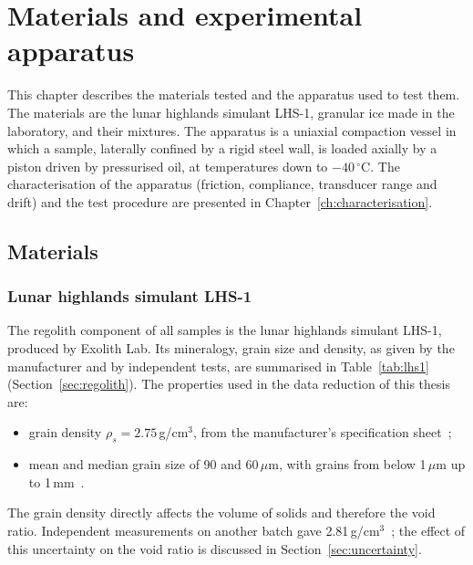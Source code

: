 \chapter{Materials and experimental apparatus}
\label{ch:materials_apparatus}%

This chapter describes the materials tested and the apparatus used to test them. The materials are the lunar highlands simulant LHS-1, granular ice made in the laboratory, and their mixtures. The apparatus is a uniaxial compaction vessel in which a sample, laterally confined by a rigid steel wall, is loaded axially by a piston driven by pressurised oil, at temperatures down to $-40\,^\circ$C. The characterisation of the apparatus (friction, compliance, transducer range and drift) and the test procedure are presented in Chapter~\ref{ch:characterisation}.


\section{Materials}
\label{sec:materials}

\subsection{Lunar highlands simulant LHS-1}
\label{subsec:lhs1}

The regolith component of all samples is the lunar highlands simulant LHS-1, produced by Exolith Lab. Its mineralogy, grain size and density, as given by the manufacturer and by independent tests, are summarised in Table~\ref{tab:lhs1} (Section~\ref{sec:regolith}). The properties used in the data reduction of this thesis are:
\begin{itemize}
    \item grain density $\rho_s = 2.75$\,g/cm$^3$, from the manufacturer's specification sheet~\cite{exolithLHS1};
    \item mean and median grain size of 90 and 60\,$\mu$m, with grains from below 1\,$\mu$m up to 1\,mm~\cite{exolithLHS1}.
\end{itemize}
The grain density directly affects the volume of solids and therefore the void ratio. Independent measurements on another batch gave 2.81\,g/cm$^3$~\cite{agarwal2023}; the effect of this uncertainty on the void ratio is discussed in Section~\ref{sec:uncertainty}.

